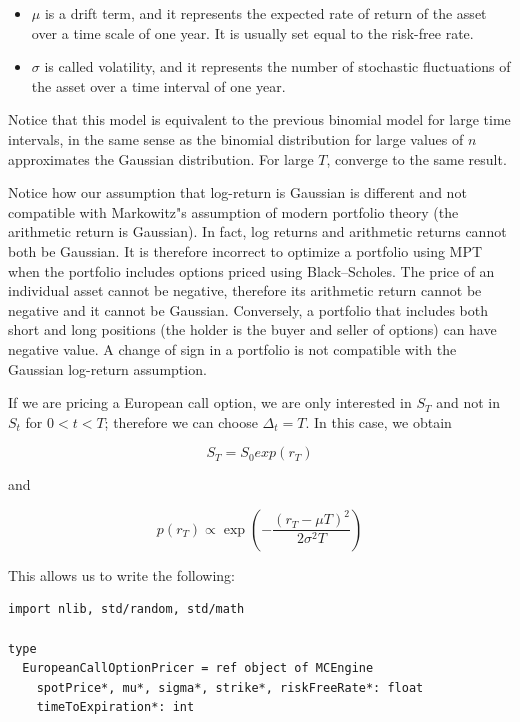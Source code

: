 \documentclass[justified, sixbynine]{tufte-book}
\def\ft{\small\tt}
\theoremstyle{plain}%
\newtheorem * {corollary}{Corollary}
\theoremstyle{definition}
\theoremstyle{remark}
\newtheorem * {remark}{Remark}
\newtheorem * {note}{Note}
\begin{document}
\begin{fullwidth}
\begin{itemize}
\item  $\mu $ is a drift term, and it represents the expected rate of return
of the asset over a time scale of one year. It is usually set equal to the risk-free rate.

\item  $\sigma $ is called volatility, and it represents the number of
stochastic fluctuations of the asset over a time interval of one year.
\end{itemize}

Notice that this model is equivalent to the previous binomial model for large time intervals, in the same sense as the binomial distribution for large values of $n$ approximates the Gaussian distribution. For large $T$, converge to the same result.

Notice how our assumption that log-return is Gaussian is different and not compatible with Markowitz"s assumption of modern portfolio theory (the arithmetic return is Gaussian). In fact, log returns and arithmetic returns cannot both be Gaussian. It is therefore incorrect to optimize a portfolio using MPT when the portfolio includes options priced using Black--Scholes. The price of an individual asset cannot be negative, therefore its arithmetic return cannot be negative and it cannot be Gaussian. Conversely, a portfolio that includes both short and long positions (the holder is the buyer and seller of options) can have negative value. A change of sign in a portfolio is not compatible with the Gaussian log-return assumption.

If we are pricing a European call option, we are only interested in $S_T$ and not in $S_t$ for $0<t<T$; therefore we can choose $\Delta_t = T$. In this case, we obtain

\begin{equation}
S_T = S_0 exp(r_T)
\end{equation}

and

\begin{equation}
p(r_T) \propto \exp\left(-\frac{(r_T-\mu T)^2}{2\sigma^2 T}\right)
\end{equation}

This allows us to write the following:

\begin{lstlisting}[caption={in file: {\ft options.nim}}]
import nlib, std/random, std/math

type
  EuropeanCallOptionPricer = ref object of MCEngine
    spotPrice*, mu*, sigma*, strike*, riskFreeRate*: float
    timeToExpiration*: int


\end{lstlisting}
\end{fullwidth}
\end{document}

